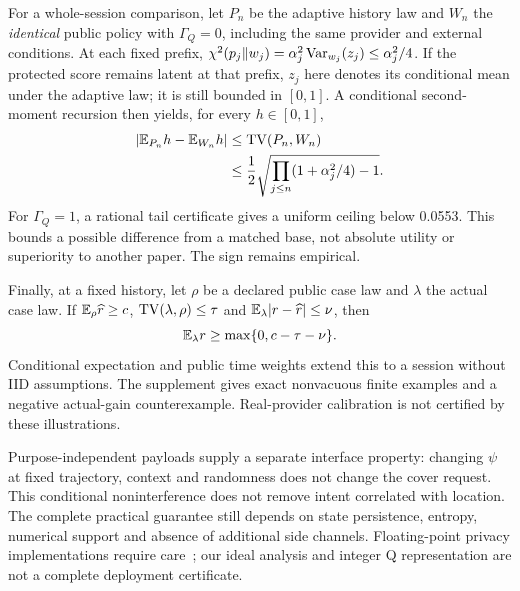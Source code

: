 For a whole-session comparison, let $P_n$ be the adaptive history law and $W_n$ the
\emph{identical} public policy with $\Gamma_Q=0$, including the same provider and
external conditions. At each fixed prefix,
$\chi^2(p_j\Vert w_j)=\alpha_j^2\operatorname{Var}_{w_j}(z_j)\le\alpha_j^2/4$.
If the protected score remains latent at that prefix, $z_j$ here denotes its
conditional mean under the adaptive law; it is still bounded in $[0,1]$.
A conditional second-moment recursion then yields, for every $h\in[0,1]$,
\begin{align}
|\mathbb E_{P_n}h-\mathbb E_{W_n}h|
&\le\operatorname{TV}(P_n,W_n)\\
&\le\frac12\sqrt{\prod_{j\le n}(1+\alpha_j^2/4)-1}. \label{eq:tv}
\end{align}
For $\Gamma_Q=1$, a rational tail certificate gives a uniform ceiling below
0.0553. This bounds a possible difference from a matched base, not absolute
utility or superiority to another paper. The sign remains empirical.

Finally, at a fixed history, let $\rho$ be a declared public case law and $\lambda$
the actual case law. If $\mathbb E_\rho\widehat r\ge c$,
$\operatorname{TV}(\lambda,\rho)\le\tau$ and $\mathbb E_\lambda|r-\widehat r|\le\nu$, then
\begin{equation}
\mathbb E_\lambda r\ge\max\{0,c-\tau-\nu\}. \label{eq:floor}
\end{equation}
Conditional expectation and public time weights extend this to a session without
IID assumptions. The supplement gives exact nonvacuous finite examples and a
negative actual-gain counterexample. Real-provider calibration is not certified
by these illustrations.

Purpose-independent payloads supply a separate interface property: changing $\psi$
at fixed trajectory, context and randomness does not change the cover request.
This conditional noninterference does not remove intent correlated with location.
The complete practical guarantee still depends on state persistence, entropy,
numerical support and absence of additional side channels. Floating-point privacy
implementations require care~\cite{mironov}; our ideal analysis and integer Q
representation are not a complete deployment certificate.
